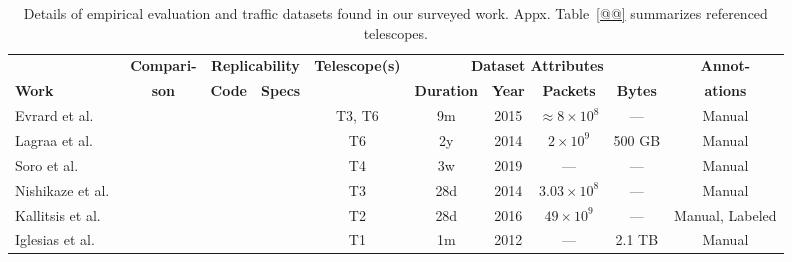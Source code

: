 \documentclass[manuscript,nonacm]{acmart}
\newcommand{\cmark}{\ding{51}}%
\begin{document}
\begin{table}[h!]
    \small
    \setlength{\tabcolsep}{4pt}
    \caption{Details of empirical evaluation and traffic datasets found in our surveyed work. Appx. Table~\ref{@@} summarizes referenced telescopes.}
    \label{tab:eval}
    \begin{tabular}{@{}lccccccccc@{}}
        \toprule
        & \multicolumn{1}{c}{\textbf{Compari-}} 
        & \multicolumn{2}{c}{\bf Replicability} 
        & \multicolumn{1}{c}{\textbf{Telescope(s)}} 
        & \multicolumn{4}{c}{\bf Dataset Attributes} 
        & \multicolumn{1}{c}{\textbf{Annot-}} \\
        \cmidrule(lr){3-4} \cmidrule(lr){6-9}
        \textbf{Work} & \textbf{son} & \textbf{Code} & \textbf{Specs} &  & \textbf{Duration} & \textbf{Year} & \textbf{Packets} & \textbf{Bytes} & \textbf{ations} \\
        \midrule
        Evrard et al.~\cite{2019evrard}
        &  
        &  & 
        & T3, T6
        & 9m & 2015
        & ${\approx}8\times10^{8}$ & ---
        & Manual \\

        Lagraa et al.~\cite{2017lagraa,2019lagraa}
        &  
        &  & \cmark
        & T6
        & 2y & 2014
        & $2\times10^{9}$ & 500 GB
        & Manual \\

        Soro et al.~\cite{2020soro}
        &  
        &  & 
        & T4
        & 3w & 2019
        & --- & ---
        & Manual \\

        Nishikaze et al.~\cite{2015nishikaze}
        &  
        &  & 
        & T3
        & 28d & 2014
        & $3.03\times10^{8}$ & ---
        &  Manual \\

        Kallitsis et al.~\cite{2022kallitsis}
        & \cite{2021gioacchini}
        & \cmark & \cmark
        & T2
        & 28d & 2016
        & $49\times10^{9}$ & ---
        & Manual, Labeled \\

        Iglesias et al.~\cite{2019iglesias}
        &  
        &  & \cmark
        & T1
        & 1m & 2012
        & --- & 2.1 TB
        &  Manual \\


\end{tabular}
\end{table}
\end{document}
